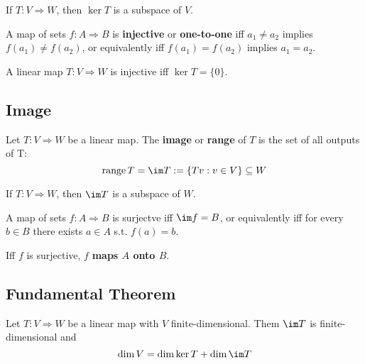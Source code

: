 \begin{theorem} If $T : V \Rightarrow W$, then $\ker T$ is a subspace of $V$.
\end{theorem}

\begin{definition}[Injective]
  A map of sets $f : A \Rightarrow B$ is \textbf{injective} or \textbf{one-to-one} iff $a_1 \neq a_2$ implies $f(a_1) \neq f(a_2)$, or equivalently iff $f(a_1) = f(a_2)$ implies $a_1 = a_2$.
\end{definition}

\begin{theorem}
  A linear map $T : V \Rightarrow W$ is injective iff $\ker T = \{ 0 \}$.
\end{theorem}

\subsection{Image}

\begin{definition}[Image]
  Let $T : V \Rightarrow W$ be a linear map. The \textbf{image} or \textbf{range} of $T$ is the set of all outputs of T:
  \[
    \operatorname{range} T = \im T := \{ Tv : v \in V \} \subseteq W
  \]
\end{definition}

\begin{theorem} If $T : V \Rightarrow W$, then $\im T$ is a subspace of $W$.
\end{theorem}

\begin{definition}[Surjective]
  A map of sets $f : A \Rightarrow B$ is surjectve iff $\im f = B$, or equivalently iff for every $b \in B$ there exists $a \in A$ s.t. $f(a) = b$.

  Iff $f$ is surjective, $f$ \textbf{maps $A$ onto $B$}.
\end{definition}

\subsection{Fundamental Theorem}

\begin{namedtheorem}
  Let $T : V \Rightarrow W$ be a linear map with $V$ finite-dimensional. Them $\im T$ is finite-dimensional and
  \[
    \dim V = \dim \ker T + \dim \im T
  \]
\end{namedtheorem}

